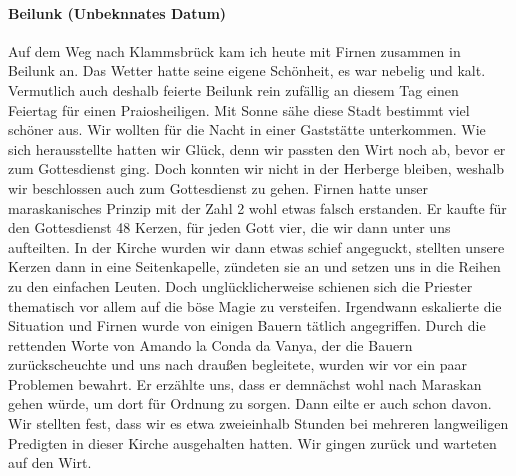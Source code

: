 \paragraph{Beilunk (Unbeknnates Datum)}
Auf dem Weg nach Klammsbrück kam ich heute mit Firnen zusammen in Beilunk an. Das Wetter hatte seine eigene Schönheit, es war nebelig und kalt. Vermutlich auch deshalb feierte Beilunk rein zufällig an diesem Tag einen Feiertag für einen Praiosheiligen. Mit Sonne sähe diese Stadt bestimmt viel schöner aus. Wir wollten für die Nacht in einer Gaststätte unterkommen. Wie sich herausstellte hatten wir Glück, denn wir passten den Wirt noch ab, bevor er zum Gottesdienst ging. Doch konnten wir nicht in der Herberge bleiben, weshalb wir beschlossen auch zum Gottesdienst zu gehen. Firnen hatte unser maraskanisches Prinzip mit der Zahl 2 wohl etwas falsch erstanden. Er kaufte für den Gottesdienst 48 Kerzen, für jeden Gott vier, die wir dann unter uns aufteilten. In der Kirche wurden wir dann etwas schief angeguckt, stellten unsere Kerzen dann in eine Seitenkapelle, zündeten sie an und setzen uns in die Reihen zu den einfachen Leuten. Doch unglücklicherweise schienen sich die Priester thematisch vor allem auf die böse Magie zu versteifen. Irgendwann eskalierte die Situation und Firnen wurde von einigen Bauern tätlich angegriffen. Durch die rettenden Worte von Amando la Conda da Vanya, der die Bauern zurückscheuchte und uns nach draußen begleitete, wurden wir vor ein paar Problemen bewahrt. Er erzählte uns, dass er demnächst wohl nach Maraskan gehen würde, um dort für Ordnung zu sorgen. Dann eilte er auch schon davon. Wir stellten fest, dass wir es etwa zweieinhalb Stunden bei mehreren langweiligen Predigten in dieser Kirche ausgehalten hatten. Wir gingen zurück und warteten auf den Wirt.

